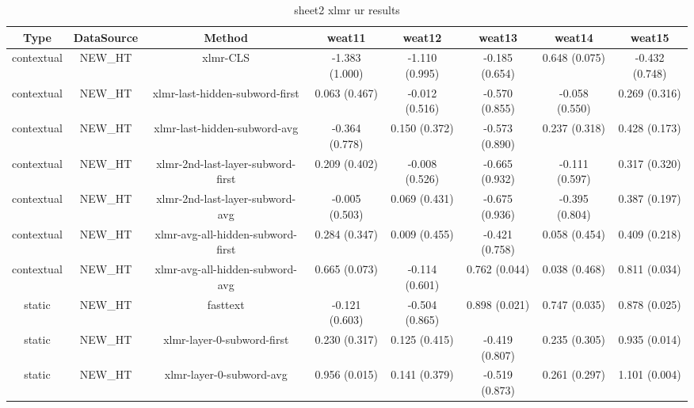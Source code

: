 \begin{sidewaystable}[htb]
    \centering
    \caption{sheet2 xlmr ur results}
    \label{appendix_tab:sheet2_xlmr_ur_results}
    \small
    \begin{tabular}{@{}cccccccc@{}}
        \toprule
        Type & DataSource & Method & weat11 & weat12 & weat13 & weat14 & weat15 \\
        \midrule
        contextual & NEW\_HT & xlmr-CLS & -1.383 (1.000) & -1.110 (0.995) & -0.185 (0.654) & 0.648 (0.075) & -0.432 (0.748) \\
        contextual & NEW\_HT & xlmr-last-hidden-subword-first & 0.063 (0.467) & -0.012 (0.516) & -0.570 (0.855) & -0.058 (0.550) & 0.269 (0.316) \\
        contextual & NEW\_HT & xlmr-last-hidden-subword-avg & -0.364 (0.778) & 0.150 (0.372) & -0.573 (0.890) & 0.237 (0.318) & 0.428 (0.173) \\
        contextual & NEW\_HT & xlmr-2nd-last-layer-subword-first & 0.209 (0.402) & -0.008 (0.526) & -0.665 (0.932) & -0.111 (0.597) & 0.317 (0.320) \\
        contextual & NEW\_HT & xlmr-2nd-last-layer-subword-avg & -0.005 (0.503) & 0.069 (0.431) & -0.675 (0.936) & -0.395 (0.804) & 0.387 (0.197) \\
        contextual & NEW\_HT & xlmr-avg-all-hidden-subword-first & 0.284 (0.347) & 0.009 (0.455) & -0.421 (0.758) & 0.058 (0.454) & 0.409 (0.218) \\
        contextual & NEW\_HT & xlmr-avg-all-hidden-subword-avg & 0.665 (0.073) & -0.114 (0.601) & 0.762 (0.044) & 0.038 (0.468) & 0.811 (0.034) \\
        static & NEW\_HT & fasttext & -0.121 (0.603) & -0.504 (0.865) & 0.898 (0.021) & 0.747 (0.035) & 0.878 (0.025) \\
        static & NEW\_HT & xlmr-layer-0-subword-first & 0.230 (0.317) & 0.125 (0.415) & -0.419 (0.807) & 0.235 (0.305) & 0.935 (0.014) \\
        static & NEW\_HT & xlmr-layer-0-subword-avg & 0.956 (0.015) & 0.141 (0.379) & -0.519 (0.873) & 0.261 (0.297) & 1.101 (0.004) \\
        \bottomrule
    \end{tabular}
\end{sidewaystable}